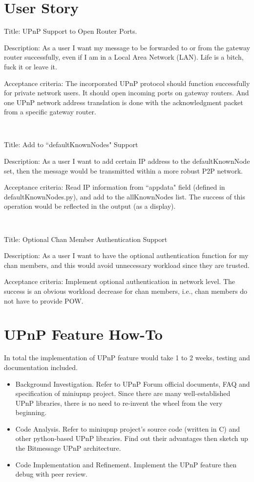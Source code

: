 \documentclass{article}
\begin{document}
\section{User Story}
Title: UPnP Support to Open Router Ports.
\par
Description: As a user I want my message to be forwarded to or from
the gateway router successfully, even if I am in a Local Area Network
(LAN). Life is a bitch, fuck it or leave it.
\par
Acceptance criteria: The incorporated UPnP protocol should function successfully for private network users. It should open incoming ports on gateway routers. And one UPnP network address translation is done with the acknowledgment packet from a specific gateway router.
\par
~
\par
\par
Title: Add to ``defaultKnownNodes" Support
\par
Description: As a user I want to add certain IP address to the defaultKnownNode set, then the message would be transmitted within a more robust P2P network.
\par
Acceptance criteria: Read IP information from ``appdata" field (defined in defaultKnownNodes.py), and add to the allKnownNodes list. The success of this operation would be reflected in the output (as a display).
\par
~
\par
Title: Optional Chan Member Authentication Support
\par
Description: As a user I want to have the optional authentication function for my chan members, and this would avoid unnecessary workload since they are trusted.
\par
Acceptance criteria: Implement optional authentication in network level. The success is an obvious workload decrease for chan members, i.e., chan members do not have to provide POW.


\section{UPnP Feature How-To}
In total the implementation of UPnP feature would take 1 to 2 weeks, testing and documentation included.
\begin{itemize}
  \item Background Investigation. Refer to UPnP Forum official documents, FAQ and specification of miniupnp project. Since there are many well-established UPnP libraries, there is no need to re-invent the wheel from the very beginning.
  \item Code Analysis. Refer to miniupnp project's source code (written in C) and other python-based UPnP libraries. Find out their advantages then sketch up the Bitmessage UPnP architecture.
  \item Code Implementation and Refinement. Implement the UPnP feature then debug with peer review.
\end{itemize}
\end{document}
